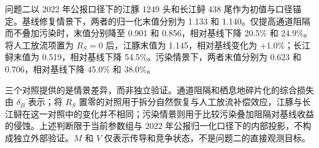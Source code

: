 问题二以 2022 年公报口径下的江豚 1249 头和长江鲟 438 尾作为初值与口径锚定。基线修复情景下，两者的归一化末值分别为 1.133 和 1.140。仅提高通道阻隔而不叠加污染时，末值分别降至 0.901 和 0.856，相对基线下降 20.5\% 和 24.9\%。将人工放流项置为 \(R_S=0\) 后，江豚末值为 1.145，相对基线变化为 +1.0\%；长江鲟末值为 0.519，相对基线下降 54.5\%。污染情景下，两者末值分别为 0.623 和 0.706，相对基线下降 45.0\% 和 38.0\%。

三个对照提供的是情景差异，而非独立验证。通道阻隔和栖息地碎片化的综合损失由 \(\delta_B\) 表示；将 \(R_S\) 置零的对照用于拆分自然恢复与人工放流补偿效应，江豚与长江鲟在这一对照中的变化并不相同；污染情景则用于比较污染叠加阻隔对基线收益的侵蚀。上述判断限于当前参数组与 2022 年公报归一化口径下的内部投影，不构成独立外部验证。\(M\) 和 \(V\) 仅表示传导和竞争状态，不是问题二的直接观测目标。
